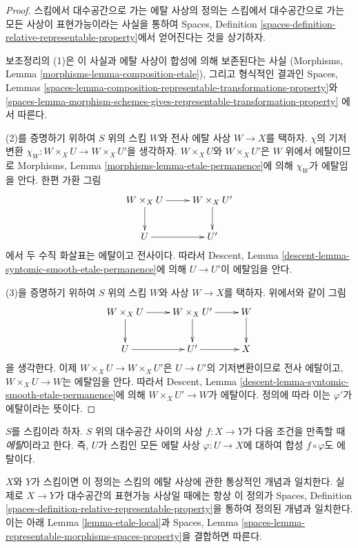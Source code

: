 \begin{proof}
스킴에서 대수공간으로 가는 에탈 사상의 정의는
스킴에서 대수공간으로 가는 모든 사상이 표현가능이라는 사실을 통하여
Spaces, Definition
\ref{spaces-definition-relative-representable-property}에서 얻어진다는
것을 상기하자.

\medskip\noindent
보조정리의 (1)은 이 사실과 에탈 사상이 합성에 의해 보존된다는 사실
(Morphisms, Lemma
\ref{morphisms-lemma-composition-etale}), 그리고 형식적인 결과인
Spaces, Lemmas
\ref{spaces-lemma-composition-representable-transformations-property}와
\ref{spaces-lemma-morphism-schemes-gives-representable-transformation-property}
에서 따른다.

\medskip\noindent
(2)를 증명하기 위하여 $S$ 위의 스킴 $W$와 전사 에탈 사상
$W \to X$를 택하자. $\chi$의 기저변환
$\chi_W : W \times_X U \to W \times_X U'$을 생각하자.
$W \times_X U$와 $W \times_X U'$은 $W$ 위에서 에탈이므로
Morphisms, Lemma \ref{morphisms-lemma-etale-permanence}에 의해
$\chi_W$가 에탈임을 안다.
한편 가환 그림
$$
\xymatrix{
W \times_X U \ar[r] \ar[d] & W \times_X U' \ar[d] \\
U \ar[r] & U'
}
$$
에서 두 수직 화살표는 에탈이고 전사이다.
따라서 Descent, Lemma
\ref{descent-lemma-syntomic-smooth-etale-permanence}에 의해
$U \to U'$이 에탈임을 안다.

\medskip\noindent
(3)을 증명하기 위하여 $S$ 위의 스킴 $W$와 사상 $W \to X$를 택하자.
위에서와 같이 그림
$$
\xymatrix{
W \times_X U \ar[r] \ar[d] & W \times_X U' \ar[d] \ar[r] & W \ar[d] \\
U \ar[r] & U' \ar[r] & X
}
$$
을 생각한다. 이제 $W \times_X U \to W \times_X U'$은
$U \to U'$의 기저변환이므로 전사 에탈이고,
$W \times_X U \to W$는 에탈임을 안다. 따라서 Descent, Lemma
\ref{descent-lemma-syntomic-smooth-etale-permanence}에 의해
$W \times_X U' \to W$가 에탈이다. 정의에 따라 이는
$\varphi'$가 에탈이라는 뜻이다.
\end{proof}

\begin{definition}
\label{definition-etale}
$S$를 스킴이라 하자.
$S$ 위의 대수공간 사이의 사상 $f : X \to Y$가 다음 조건을 만족할 때
{\it 에탈}이라고 한다. 즉, $U$가 스킴인 모든 에탈 사상
$\varphi : U \to X$에 대하여 합성 $f \circ \varphi$도 에탈이다.
\end{definition}

\noindent
$X$와 $Y$가 스킴이면 이 정의는 스킴의 에탈 사상에 관한 통상적인
개념과 일치한다. 실제로 $X \to Y$가 대수공간의 표현가능 사상일 때에는
항상 이 정의가 Spaces, Definition
\ref{spaces-definition-relative-representable-property}을 통하여 정의된
개념과 일치한다. 이는 아래 Lemma \ref{lemma-etale-local}과
Spaces, Lemma \ref{spaces-lemma-representable-morphisms-spaces-property}을
결합하면 따른다.

